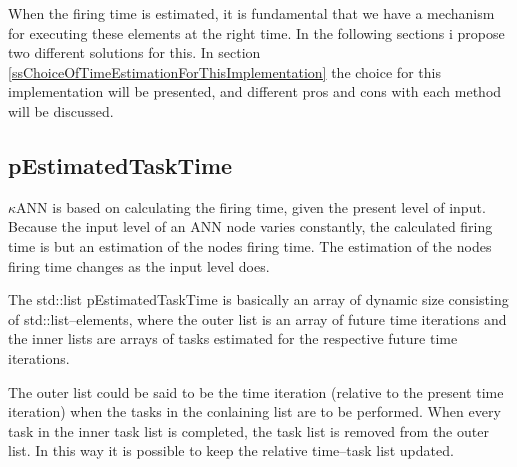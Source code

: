 	




	When the firing time is estimated, it is fundamental that we have a mechanism for executing these elements at the right time. 
	In the following sections i propose two different solutions for this. 
	In section \ref{ssChoiceOfTimeEstimationForThisImplementation} the choice for this implementation will be presented, and different pros and cons with each method will be discussed.



	
	\subsection{pEstimatedTaskTime}
	$\kappa$ANN is based on calculating the firing time, given the present level of input. 
	Because the input level of an ANN node varies constantly, the calculated firing time is but an estimation of the nodes firing time. 
	The estimation of the nodes firing time changes as the input level does.
	
	The std::list pEstimatedTaskTime is basically an array of dynamic size consisting of std::list--elements,
	where the outer list is an array of future time iterations and the inner lists are arrays of tasks estimated for the respective future time iterations.

	The outer list could be said to be the time iteration (relative to the present time iteration) when the tasks in the conlaining list are to be performed. 
	When every task in the inner task list is completed, %
		the task list is removed from the outer list. 
	In this way it is possible to keep the relative time--task list updated.

